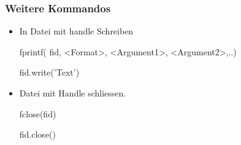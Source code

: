 \documentclass[hyperref={xetex}]{beamer}
\begin{document}
%
%
\begin{frame}[fragile]\frametitle{Weitere Kommandos}
\begin{itemize}
  \item In Datei mit handle  Schreiben
\begin{matlabin}
fprintf( fid, <Format>, <Argument1>, <Argument2>,..)
\end{matlabin}
\begin{pyin}
fid.write('Text')
\end{pyin}
  \item Datei mit Handle  schliessen.
\begin{matlabin}
fclose(fid)
\end{matlabin}
\begin{pyin}
fid.close() 
\end{pyin}
\end{itemize}
\end{frame}
\end{document}
